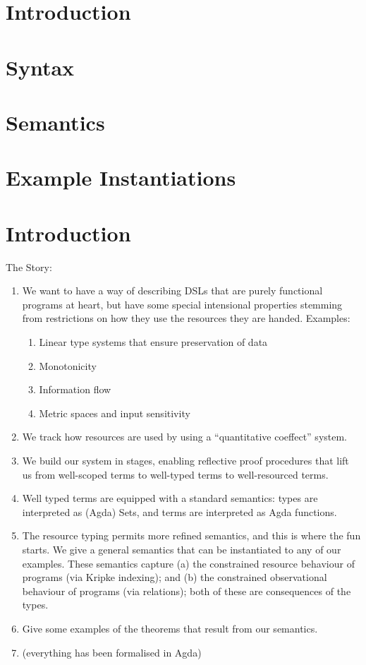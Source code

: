\documentclass[sigplan,review]{acmart}\settopmatter{printfolios=true,printccs=false,printacmref=false}
\begin{document}
\section{Introduction}
\label{sec:introduction}


\section{Syntax}
\label{sec:syntax}


\section{Semantics}
\label{sec:semantics}


\section{Example Instantiations}
\label{sec:examples}


\newpage

\appendix


\section{Introduction}

The Story:
\begin{enumerate}
\item We want to have a way of describing DSLs that are purely
  functional programs at heart, but have some special intensional
  properties stemming from restrictions on how they use the resources
  they are handed. Examples:
  \begin{enumerate}
  \item Linear type systems that ensure preservation of data
  \item Monotonicity
  \item Information flow
  \item Metric spaces and input sensitivity
  \end{enumerate}
\item We track how resources are used by using a ``quantitative
  coeffect'' system.
\item We build our system in stages, enabling reflective proof
  procedures that lift us from well-scoped terms to well-typed terms
  to well-resourced terms.
\item Well typed terms are equipped with a standard semantics: types
  are interpreted as (Agda) Sets, and terms are interpreted as Agda
  functions.
\item The resource typing permits more refined semantics, and this is
  where the fun starts. We give a general semantics that can be
  instantiated to any of our examples. These semantics capture (a) the
  constrained resource behaviour of programs (via Kripke indexing);
  and (b) the constrained observational behaviour of programs (via
  relations); both of these are consequences of the types.
\item Give some examples of the theorems that result from our
  semantics.
\item (everything has been formalised in Agda)
\end{enumerate}
\end{document}
